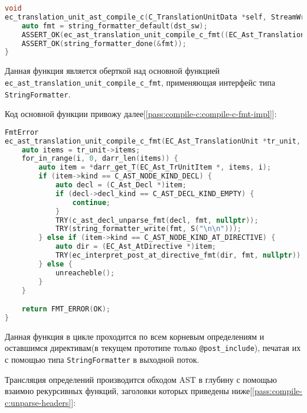 \begin{lstlisting}[language=c, caption={Проход трансляции в язык Си}, label={pass:compile-c:compile-c-impl}]
void
ec_translation_unit_ast_compile_c(C_TranslationUnitData *self, StreamWriter *dst_sw) {
    auto fmt = string_formatter_default(dst_sw);
    ASSERT_OK(ec_ast_translation_unit_compile_c_fmt((EC_Ast_TranslationUnit *)self->tr_unit, &fmt, nullptr));
    ASSERT_OK(string_formatter_done(&fmt));
}
\end{lstlisting}


Данная функция является оберткой над основной функцией \newline \verb|ec_ast_translation_unit_compile_c_fmt|, применяющая интерфейс типа \verb|StringFormatter|.

Код основной функции привожу далее[\ref{pass:compile-c:compile-c-fmt-impl}]:

\begin{lstlisting}[language=c, caption={Функция трансляции типа Единицы Трансляции}, label={pass:compile-c:compile-c-fmt-impl}]
FmtError
ec_ast_translation_unit_compile_c_fmt(EC_Ast_TranslationUnit *tr_unit, StringFormatter *fmt, void *_) {
    auto items = tr_unit->items;
    for_in_range(i, 0, darr_len(items)) {
        auto item = *darr_get_T(EC_Ast_TrUnitItem *, items, i);
        if (item->kind == C_AST_NODE_KIND_DECL) {
            auto decl = (C_Ast_Decl *)item;
            if (decl->decl_kind == C_AST_DECL_KIND_EMPTY) {
                continue;
            }
            TRY(c_ast_decl_unparse_fmt(decl, fmt, nullptr));
            TRY(string_formatter_write(fmt, S("\n\n")));
        } else if (item->kind == C_AST_NODE_KIND_AT_DIRECTIVE) {
            auto dir = (EC_Ast_AtDirective *)item;
            TRY(ec_interpret_post_at_directive_fmt(dir, fmt, nullptr));
        } else {
            unreacheble();
        }
    }

    return FMT_ERROR(OK);
}
\end{lstlisting}


Данная функция в цикле проходится по всем корневым определениям и оставшимся директивам(в текущем прототипе только \verb|@post_include|),
печатая их с помощью типа \verb|StringFormatter| в выходной поток.

Трансляция определений производится обходом AST в глубину с помощью взаимно рекурсивных функций, заголовки которых приведены ниже[\ref{pass:compile-c:unparse-headers}]:

